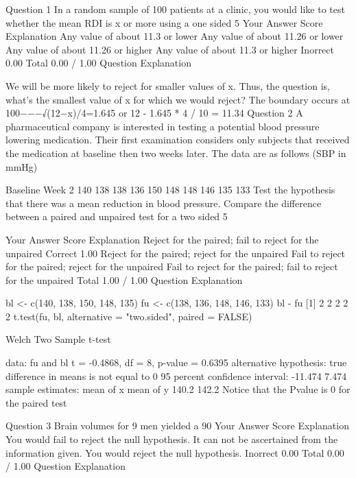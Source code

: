 Question 1
In a random sample of 100 patients at a clinic, you would like to test whether the mean RDI is x or more using a one sided 5%
Your Answer		Score	Explanation
Any value of about 11.3 or lower			
Any value of about 11.26 or lower			
Any value of about 11.26 or higher			
Any value of about 11.3 or higher	Inorrect	0.00	
Total		0.00 / 1.00	
Question Explanation

We will be more likely to reject for smaller values of x. Thus, the question is, what's the smallest value of x for which we would reject? The boundary occurs at 100−−−√(12−x)/4=1.645 or 12 - 1.645 * 4 / 10 = 11.34
Question 2
A pharmaceutical company is interested in testing a potential blood pressure lowering medication. Their first examination considers only subjects that received the medication at baseline then two weeks later. The data are as follows (SBP in mmHg)

Baseline	Week 2
140	138
138	136
150	148
148	146
135	133
Test the hypothesis that there was a mean reduction in blood pressure. Compare the difference between a paired and unpaired test for a two sided 5%

Your Answer		Score	Explanation
Reject for the paired; fail to reject for the unpaired	Correct	1.00	
Reject for the paired; reject for the unpaired			
Fail to reject for the paired; reject for the unpaired			
Fail to reject for the paired; fail to reject for the unpaired			
Total		1.00 / 1.00	
Question Explanation

bl <- c(140, 138, 150, 148, 135)
fu <- c(138, 136, 148, 146, 133)
bl - fu
[1] 2 2 2 2 2
t.test(fu, bl, alternative = "two.sided", paired = FALSE)

    Welch Two Sample t-test

data:  fu and bl 
t = -0.4868, df = 8, p-value = 0.6395
alternative hypothesis: true difference in means is not equal to 0 
95 percent confidence interval:
 -11.474   7.474 
sample estimates:
mean of x mean of y 
    140.2     142.2 
Notice that the Pvalue is 0 for the paired test

Question 3
Brain volumes for 9 men yielded a 90 %
Your Answer		Score	Explanation
You would fail to reject the null hypothesis.			
It can not be ascertained from the information given.			
You would reject the null hypothesis.	Inorrect	0.00	
Total		0.00 / 1.00	
Question Explanation

